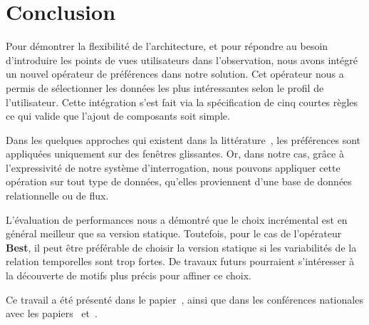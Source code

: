 \section{Conclusion}
Pour démontrer la flexibilité de l'architecture, et pour répondre au besoin d'introduire les points de vues utilisateurs dans l'observation, nous avons intégré un nouvel opérateur de préférences dans notre solution. Cet opérateur nous a permis de sélectionner les données les plus intéressantes selon le profil de l'utilisateur. Cette intégration s'est fait via la spécification de cinq courtes règles ce qui valide que l'ajout de composants soit simple.

Dans les quelques approches qui existent dans la littérature~\cite{Kontaki:topk,Morse:skyline,Mouratidis:topk}, les préférences sont appliquées uniquement sur des fenêtres glissantes. Or, dans notre cas, grâce à l'expressivité de notre système d'interrogation, nous pouvons appliquer cette opération sur tout type de données, qu'elles proviennent d'une base de données relationnelle ou de flux.

L'évaluation de performances nous a démontré que le choix incrémental est en général meilleur que sa version statique. Toutefois, pour le cas de l'opérateur \textbf{Best}, il peut être préférable de choisir la version statique si les variabilités de la relation temporelles sont trop fortes. De travaux futurs pourraient s'intéresser à la découverte de motifs plus précis pour affiner ce choix.

Ce travail a été présenté dans le papier~\cite{Petit:topk}, ainsi que dans les conférences nationales avec les papiers~\cite{Roncancio:pref} et~\cite{Petit:topkbda}.